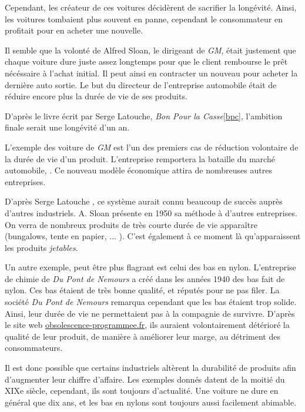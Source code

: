Cependant, les créateur de ces voitures décidèrent de sacrifier la longévité. Ainsi, les voitures tombaient plus souvent en panne, cependant le consommateur en profitait pour en acheter une nouvelle.


Il semble que la volonté de Alfred Sloan, le dirigeant de \textit{GM}, était justement que chaque voiture dure juste assez longtemps pour que le client rembourse le prêt nécéssaire à l'achat initial.
Il peut ainsi en contracter un nouveau pour acheter la dernière auto sortie. Le but du directeur de l'entreprise automobile était de réduire encore plus la durée de vie de ses produits.

D'après le livre écrit par Serge Latouche, \textit{Bon Pour la Casse}\ref{bpc}, l'ambition finale serait une longévité d'un an.

\smallbreak

L'exemple des voiture de \textit{GM} est l'un des premiers cas de réduction volontaire de la durée de vie d'un produit. L'entreprise remportera la bataille du marché automobile, .
Ce nouveau modèle économique attira de nombreuses autres entreprises. 


D'après Serge Latouche \cite{bpc}, ce système aurait connu beaucoup de succès auprès d'autres industriels. A. Sloan présente en 1950 sa méthode à d'autres entreprises. On verra de nombreux produits de très courte durée de vie apparaître (bungalows, tente en papier, ... ). C'est également à ce moment là qu'apparaissent les produits \textit{jetables}.

Un autre exemple, peut être plus flagrant est celui des bas en nylon.
L'entreprise de chimie de \textit{Du Pont de Nemours} a créé dans les années 1940 des bas fait de nylon.
Ces bas étaient de très bonne qualité, et réputés pour ne pas filer. La société \textit{Du Pont de Nemours} remarqua cependant que les bas étaient trop solide. 
Ainsi, leur durée de vie ne permettaient pas à la compagnie de survivre.
D'après le site web \url{obsolescence-programmee.fr}, ils auraient volontairement détérioré la qualité de leur produit, de manière à améliorer leur marge, au détriment des consommateurs. 

\smallbreak

Il est donc possible que certains industriels altèrent la durabilité de produits afin d'augmenter leur chiffre d'affaire. Les exemples donnés datent de la moitié du XIXe siècle, cependant, ils sont toujours d'actualité. Une voiture ne dure en général que dix ans, et les bas en nylons sont toujours aussi facilement abimable. 

